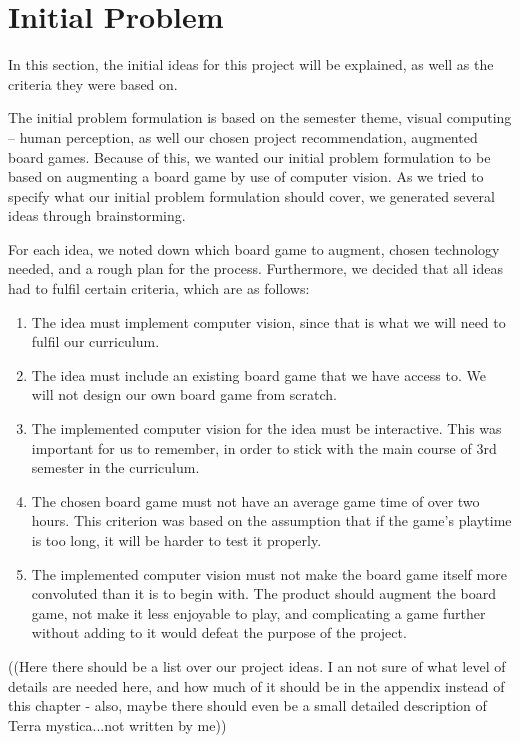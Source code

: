 \chapter{Initial Problem}\label{ch:iniprob}
In this section, the initial ideas for this project will be explained, as well as the criteria they were based on.

The initial problem formulation is based on the semester theme, visual computing -- human perception, as well our chosen project recommendation, augmented board games. Because of this, we wanted our initial problem formulation to be based on augmenting a board game by use of computer vision. As we tried to specify what our initial problem formulation should cover, we generated several ideas through brainstorming.

For each idea, we noted down which board game to augment, chosen technology needed, and a rough plan for the process. Furthermore, we decided that all ideas had to fulfil certain criteria, which are as follows:
\begin{enumerate}
	\item The idea must implement computer vision, since that is what we will need to fulfil our curriculum.
	\item The idea must include an existing board game that we have access to. We will not design our own board game from scratch.
	\item The implemented computer vision for the idea must be interactive. This was important for us to remember, in order to stick with the main course of 3rd semester in the curriculum.
	\item The chosen board game must not have an average game time of over two hours. This criterion was based on the assumption that if the game's playtime is too long, it will be harder to test it properly.
	\item The implemented computer vision must not make the board game itself more convoluted than it is to begin with. The product should augment the board game, not make it less enjoyable to play, and complicating a game further without adding to it would defeat the purpose of the project.
\end{enumerate}

((Here there should be a list over our project ideas. I an not sure of what level of details are needed here, and how much of it should be in the appendix instead of this chapter - also, maybe there should even be a small detailed description of Terra mystica...not written by me))

